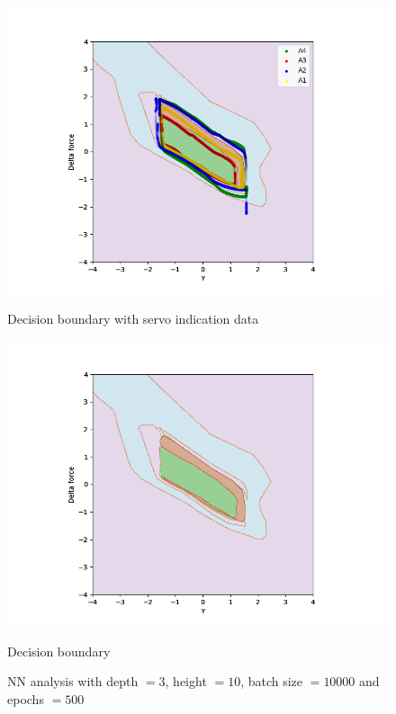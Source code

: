             \begin{figure}[]
                \begin{minipage}[b]{0.5\linewidth}
                    \centering
                    \includegraphics[width = 1\textwidth]{figures/analysis/nn/neural_net_h10_d3_e500_b10000.png}
                    \caption*{Decision boundary with servo indication data}
                \end{minipage}
                \hfill
                \begin{minipage}[b]{0.5\linewidth}
                    \centering
                    \includegraphics[width = 1\textwidth]{figures/analysis/nn/neural_net_h10_d3_e500_b10000countour.png}
                    \caption*{Decision boundary}
                \end{minipage}
                \caption{NN analysis with depth $= 3$, height $=10$, batch size $=10000$ and epochs $=500$ }
                \label{fig:nn_servo_overfit}
            \end{figure}
            
